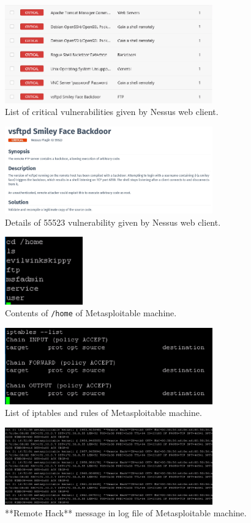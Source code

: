 \documentclass[a4paper]{article}
\begin{document}
	\begin{figure}[h!]
		\centering
		\includegraphics[width=0.8\textwidth]{2_2_8}
		\caption{List of critical vulnerabilities given by Nessus web client.}
		\label{fig:8}
	\end{figure}

	\begin{figure}[h!]
		\centering
		\includegraphics[width=0.8\textwidth]{2_2_15}
		\caption{Details of 55523 vulnerability given by Nessus web client.}
		\label{fig:9}
	\end{figure}

	\begin{figure}[h!]
		\centering
		\includegraphics[width=0.3\textwidth]{2_3_16}
		\caption{Contents of \texttt{/home} of Metasploitable machine.}
		\label{fig:10}
	\end{figure}

	\begin{figure}[h!]
		\centering
		\includegraphics[width=0.8\textwidth]{2_3_19}
		\caption{List of iptables and rules of Metasploitable machine.}
		\label{fig:11}
	\end{figure}

	\begin{figure}[h!]
		\centering
		\includegraphics[width=0.8\textwidth]{2_3_24}
		\caption{**Remote Hack** message in log file of Metasploitable machine.}
		\label{fig:12}
	\end{figure}
\end{document}
